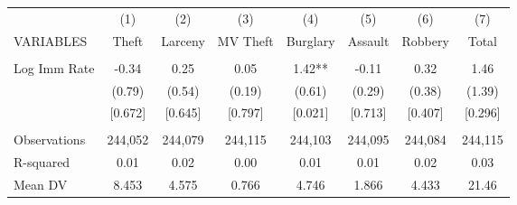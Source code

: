 \begin{tabular}{lccccccc} \hline
 & (1) & (2) & (3) & (4) & (5) & (6) & (7) \\
VARIABLES & Theft & Larceny & MV Theft & Burglary & Assault & Robbery & Total \\ \hline
 &  &  &  &  &  &  &  \\
Log Imm Rate & -0.34 & 0.25 & 0.05 & 1.42** & -0.11 & 0.32 & 1.46 \\
 & (0.79) & (0.54) & (0.19) & (0.61) & (0.29) & (0.38) & (1.39) \\
 & [0.672] & [0.645] & [0.797] & [0.021] & [0.713] & [0.407] & [0.296] \\
 &  &  &  &  &  &  &  \\
Observations & 244,052 & 244,079 & 244,115 & 244,103 & 244,095 & 244,084 & 244,115 \\
R-squared & 0.01 & 0.02 & 0.00 & 0.01 & 0.01 & 0.02 & 0.03 \\
 Mean DV & 8.453 & 4.575 & 0.766 & 4.746 & 1.866 & 4.433 & 21.46 \\ \hline
\end{tabular}

